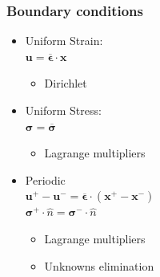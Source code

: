 \documentclass[usenames,dvipsnames]{beamer}
\begin{document}
\begin{frame}
\frametitle{Boundary conditions}

\begin{minipage}[h]{0.49\linewidth}
\begin{itemize}
\item Uniform Strain: \\ $\bm{u} = \overline{\bm{\epsilon}} \cdot \bm{x} $
  \begin{itemize}
  \item Dirichlet
  \end{itemize}
  \vspace{0.5cm}
\item Uniform Stress: \\$ \bm{\sigma} = \overline{\bm{\sigma}} $
  \begin{itemize}
  \item Lagrange multipliers
  \end{itemize}
  \vspace{0.5cm}
\item Periodic \\
$ \bm{u}^+ - \bm{u}^- = \overline{\bm{\epsilon}} \cdot (\bm{x}^+ - \bm{x}^-) $\\
$ \bm{\sigma}^+ \cdot \hat{n}  = \bm{\sigma}^- \cdot \hat{n}$
  \begin{itemize}
  \item Lagrange multipliers
  \item Unknowns elimination
  \end{itemize}
\end{itemize}
\end{minipage}
\begin{minipage}[h]{0.49\linewidth}
\end{minipage}
\end{frame}
\end{document}
